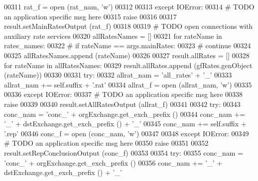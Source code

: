 \begin{DoxyCode}
00311             rat\_f = open (rat\_nam, \textcolor{stringliteral}{'w'})
00312             
00313         \textcolor{keywordflow}{except} IOError:
00314             \textcolor{comment}{# TODO an application specific msg here}
00315             \textcolor{keywordflow}{raise}        
00316 
00317         result.setMainRatesOutput (rat\_f)
00318             
00319         \textcolor{comment}{# TODO open connections with auxiliary rate services}
00320         allRatesNames = []        
00321         \textcolor{keywordflow}{for} rateName \textcolor{keywordflow}{in} rates\_names:
00322 \textcolor{comment}{#            if rateName == args.mainRates:}
00323 \textcolor{comment}{#                continue }
00324             
00325             allRatesNames.append (rateName)
00326 
00327         result.allRates = []            
00328         \textcolor{keywordflow}{for} rateName \textcolor{keywordflow}{in} allRatesNames:
00329             result.allRates.append (gfRates.genObject (rateName))
00330             
00331         \textcolor{keywordflow}{try}:
00332             allrat\_nam  =  \textcolor{stringliteral}{'all\_rates'} + \textcolor{stringliteral}{'\_'}
00333             allrat\_nam +=  self.suffix + \textcolor{stringliteral}{'.rat'}
00334             allrat\_f = open (allrat\_nam, \textcolor{stringliteral}{'w'})
00335             
00336         \textcolor{keywordflow}{except} IOError:
00337             \textcolor{comment}{# TODO an application specific msg here}
00338             \textcolor{keywordflow}{raise}        
00339 
00340         result.setAllRatesOutput (allrat\_f)
00341             
00342         \textcolor{keywordflow}{try}:
00343             conc\_nam  = \textcolor{stringliteral}{'conc\_'} + orgExchange.get\_exch\_prefix ()
00344             conc\_nam += \textcolor{stringliteral}{'\_'} + dstExchange.get\_exch\_prefix () + \textcolor{stringliteral}{'\_'} 
00345             conc\_nam += self.suffix + \textcolor{stringliteral}{'.rep'}
00346             conc\_f    = open (conc\_nam, \textcolor{stringliteral}{'w'})
00347             
00348         \textcolor{keywordflow}{except} IOError:
00349             \textcolor{comment}{# TODO an application specific msg here}
00350             \textcolor{keywordflow}{raise}        
00351 
00352         result.setRepConclusionOutput (conc\_f)
00353             
00354         \textcolor{keywordflow}{try}:
00355             conc\_nam  = \textcolor{stringliteral}{'conc\_'} + orgExchange.get\_exch\_prefix ()
00356             conc\_nam += \textcolor{stringliteral}{'\_'} + dstExchange.get\_exch\_prefix () + \textcolor{stringliteral}{'\_'} 

\end{DoxyCode}
